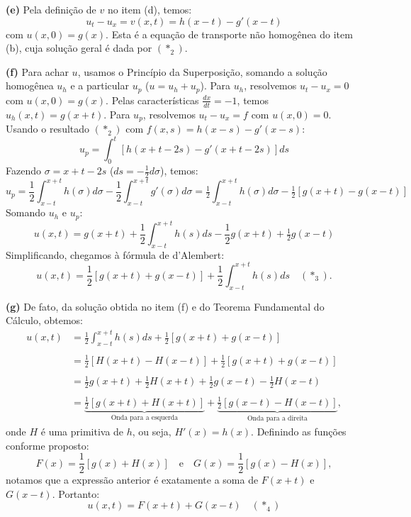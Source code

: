 \documentclass[cs_edp_2026.1.tex]{subfiles} %
\begin{document}
{	\textbf{(e)} Pela definição de $v$ no item (d), temos:
	$$ u_t - u_x = v(x, t) = h(x - t) - g'(x - t) $$
	com $u(x, 0) = g(x)$. Esta é a equação de transporte não homogênea do item (b), cuja solução geral é dada por $(\ast_2)$.
	
	\textbf{(f)} Para achar $u$, usamos o Princípio da Superposição, somando a solução homogênea $u_h$ e a particular $u_p$ ($u = u_h + u_p$).
	Para $u_h$, resolvemos $u_t - u_x = 0$ com $u(x,0) = g(x)$. Pelas características $\tfrac{dx}{dt} = -1$, temos $u_h(x, t) = g(x + t)$.
	Para $u_p$, resolvemos $u_t - u_x = f$ com $u(x,0) = 0$. Usando o resultado $(\ast_2)$ com $f(x, s) = h(x - s) - g'(x - s)$:
	$$ u_p = \int_0^t [h(x + t - 2s) - g'(x + t - 2s)] ds $$
	Fazendo $\sigma = x + t - 2s$ ($ds = -\tfrac{1}{2} d\sigma$), temos:
	$$ u_p = \frac{1}{2} \int_{x-t}^{x+t} h(\sigma) d\sigma - \frac{1}{2} \int_{x-t}^{x+t} g'(\sigma) d\sigma = \tfrac{1}{2} \int_{x-t}^{x+t} h(\sigma) d\sigma - \tfrac{1}{2} [g(x + t) - g(x - t)] $$
	Somando $u_h$ e $u_p$:
	$$ u(x, t) = g(x + t) + \frac{1}{2} \int_{x-t}^{x+t} h(s) ds - \frac{1}{2} g(x + t) + \tfrac{1}{2} g(x - t) $$
	Simplificando, chegamos à fórmula de d'Alembert:
	$$ \boxed{u(x, t) = \frac{1}{2} [g(x + t) + g(x - t)] + \frac{1}{2} \int_{x-t}^{x+t} h(s) ds \quad (\ast_3)}.$$
	
	\textbf{(g)} De fato, da solução obtida no item (f) e do Teorema Fundamental do Cálculo, obtemos:
	\begin{align*}
		u(x, t) &= \frac{1}{2} \int_{x-t}^{x+t} h(s) ds + \frac{1}{2} [g(x + t) + g(x - t)]\\
		\\
		&= \frac{1}{2} [H(x+t) - H(x-t)] + \frac{1}{2} [g(x + t) + g(x - t)]\\
		\\
		&= \frac{1}{2} g(x+t) + \frac{1}{2} H(x+t) + \frac{1}{2} g(x-t) - \frac{1}{2} H(x-t) \\
		\\
		&= \underbrace{\frac{1}{2} [g(x+t) + H(x+t)]}_{\text{Onda para a esquerda}} + \underbrace{\frac{1}{2} [g(x-t) - H(x-t)]}_{\text{Onda para a direita}},
	\end{align*}
	onde $H$ é uma primitiva de $h$, ou seja, $H'(x)=h(x)$. Definindo as funções conforme proposto:
	$$ F(x) = \frac{1}{2}[g(x) + H(x)] \quad \text{e} \quad G(x) = \frac{1}{2}[g(x) - H(x)],$$
	notamos que a expressão anterior é exatamente a soma de $F(x+t)$ e $G(x-t)$. Portanto:
	$$\boxed{u(x, t) = F(x+t) + G(x-t)\quad (\ast_4)}$$
}
\end{document}
